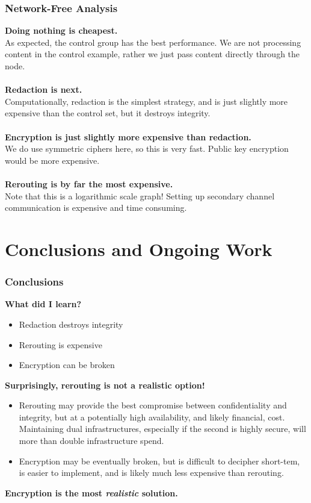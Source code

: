\documentclass[t,handout]{beamer}
\begin{document}
\begin{frame}
\frametitle{Network-Free Analysis}
{\bf Doing nothing is cheapest.} \\
{\scriptsize As expected, the control group has the best performance.  We are not processing content in the control example, rather we just pass content directly through the node.} \\
~\\
{\bf Redaction is next.} \\
{\scriptsize Computationally, redaction is the simplest strategy, and is just slightly more expensive than the control set, but it destroys integrity.} \\
~\\
{\bf Encryption is just slightly more expensive than redaction.} \\
{\scriptsize We do use symmetric ciphers here, so this is very fast.  Public key encryption would be more expensive.}\\
~\\
{\bf Rerouting is by far the most expensive.} \\
{\scriptsize Note that this is a logarithmic scale graph! Setting up secondary channel communication is expensive and time consuming.} \\
\end{frame}

\section{Conclusions and Ongoing Work}

\begin{frame}
\frametitle{Conclusions}
{\bf What did I learn?}
\begin{small}
\begin{itemize}
\item Redaction destroys integrity
\item Rerouting is expensive
\item Encryption can be broken
\end{itemize}
\end{small}
{\bf Surprisingly, rerouting is not a realistic option!}
\begin{small}
\begin{itemize}
\item Rerouting may provide the best compromise between confidentiality and integrity, but at a potentially high availability, and likely financial, cost.  Maintaining dual infrastructures, especially if the second is highly secure, will more than double infrastructure spend.
\item Encryption may be eventually broken, but is difficult to decipher short-tem, is easier to implement, and is likely much less expensive than rerouting.
\end{itemize}
\end{small}
{\bf Encryption is the most \textit{realistic} solution.}
\end{frame}
\end{document}
